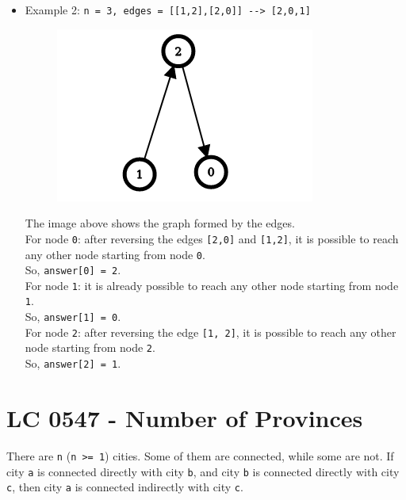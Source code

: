 \begin{itemize}
\item Example 2: {\colorbox{CodeBackground}{\lstinline|n = 3, edges = [[1,2],[2,0]] --> [2,0,1]|}}
\begin{figure}[H]
\centering
\includegraphics[width=0.3\linewidth]{images/lc2858_eg2}
\label{fig:lc2858eg2}
\end{figure}
The image above shows the graph formed by the edges.\\
For node {\colorbox{CodeBackground}{\lstinline|0|}}: after reversing the edges {\colorbox{CodeBackground}{\lstinline|[2,0]|}} and {\colorbox{CodeBackground}{\lstinline|[1,2]|}}, it is possible to reach any other node starting from node {\colorbox{CodeBackground}{\lstinline|0|}}.\\
So, {\colorbox{CodeBackground}{\lstinline|answer[0] = 2|}}.\\
For node {\colorbox{CodeBackground}{\lstinline|1|}}: it is already possible to reach any other node starting from node {\colorbox{CodeBackground}{\lstinline|1|}}.\\
So, {\colorbox{CodeBackground}{\lstinline|answer[1] = 0|}}.\\
For node {\colorbox{CodeBackground}{\lstinline|2|}}: after reversing the edge {\colorbox{CodeBackground}{\lstinline|[1, 2]|}}, it is possible to reach any other node starting from node {\colorbox{CodeBackground}{\lstinline|2|}}.\\
So, {\colorbox{CodeBackground}{\lstinline|answer[2] = 1|}}.
\end{itemize}

\section{LC 0547 - Number of Provinces}
There are {\colorbox{CodeBackground}{\lstinline|n|}} ({\colorbox{CodeBackground}{\lstinline|n >= 1|}}) cities. Some of them are connected, while some are not. If city {\colorbox{CodeBackground}{\lstinline|a|}} is connected directly with city {\colorbox{CodeBackground}{\lstinline|b|}}, and city {\colorbox{CodeBackground}{\lstinline|b|}} is connected directly with city {\colorbox{CodeBackground}{\lstinline|c|}}, then city {\colorbox{CodeBackground}{\lstinline|a|}} is connected indirectly with city {\colorbox{CodeBackground}{\lstinline|c|}}.\\

